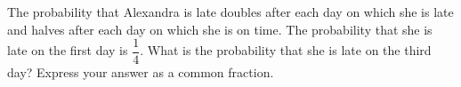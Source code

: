 The probability that Alexandra is late doubles after each day on which she is late and halves after each day on which she is on time. The probability that she is late on the first day is $\dfrac{1}{4}$. What is the probability that she is late on the third day? Express your answer as a common fraction.
